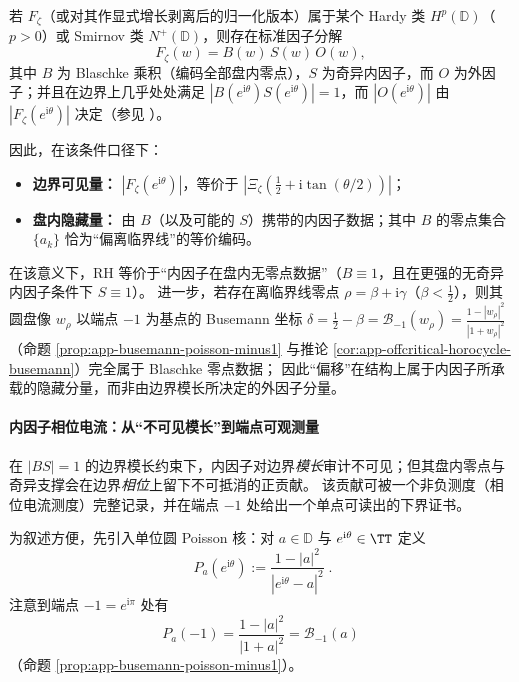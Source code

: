 \begin{remark}
若 \(F_{\zeta}\)（或对其作显式增长剥离后的归一化版本）属于某个 Hardy 类 \(H^p(\mathbb{D})\)（\(p>0\)）或 Smirnov 类 \(N^+(\mathbb{D})\)，则存在标准因子分解
\[
F_{\zeta}(w)=B(w)\,S(w)\,O(w),
\]
其中 \(B\) 为 Blaschke 乘积（编码全部盘内零点），\(S\) 为奇异内因子，而 \(O\) 为外因子；并且在边界上几乎处处满足 \(|B(e^{\mathrm{i}\theta})S(e^{\mathrm{i}\theta})|=1\)，而 \(|O(e^{\mathrm{i}\theta})|\) 由 \(|F_{\zeta}(e^{\mathrm{i}\theta})|\) 决定（参见 \cite{Duren1970TheoryHp,Garnett2007BoundedAnalyticFunctions}）。
\par
因此，在该条件口径下：
\begin{itemize}
  \item \textbf{边界可见量：} \(|F_{\zeta}(e^{\mathrm{i}\theta})|\)，等价于 \(|\Xi_{\zeta}(\tfrac12+\mathrm{i}\tan(\theta/2))|\)；
  \item \textbf{盘内隐藏量：} 由 \(B\)（以及可能的 \(S\)）携带的内因子数据；其中 \(B\) 的零点集合 \(\{a_k\}\) 恰为“偏离临界线”的等价编码。
\end{itemize}
在该意义下，RH 等价于“内因子在盘内无零点数据”（\(B\equiv 1\)，且在更强的无奇异内因子条件下 \(S\equiv 1\)）。
进一步，若存在离临界线零点 \(\rho=\beta+\mathrm{i}\gamma\)（\(\beta<\tfrac12\)），则其圆盘像 \(w_{\rho}\) 以端点 \(-1\) 为基点的 Busemann 坐标
\(
\delta=\tfrac12-\beta
=\mathcal{B}_{-1}(w_{\rho})=\frac{1-|w_{\rho}|^{2}}{|1+w_{\rho}|^{2}}
\)
（命题 \ref{prop:app-busemann-poisson-minus1} 与推论 \ref{cor:app-offcritical-horocycle-busemann}）完全属于 Blaschke 零点数据；
因此“偏移”在结构上属于内因子所承载的隐藏分量，而非由边界模长所决定的外因子分量。
\end{remark}

\paragraph{内因子相位电流：从“不可见模长”到端点可观测量}
在 \(|BS|=1\) 的边界模长约束下，内因子对边界\emph{模长}审计不可见；但其盘内零点与奇异支撑会在边界\emph{相位}上留下不可抵消的正贡献。
该贡献可被一个非负测度（相位电流测度）完整记录，并在端点 \(-1\) 处给出一个单点可读出的下界证书。

\medskip
为叙述方便，先引入单位圆 Poisson 核：对 \(a\in\mathbb{D}\) 与 \(e^{\mathrm{i}\theta}\in\TT\) 定义
\begin{equation}\label{eq:app-poisson-kernel}
\boxed{\;
P_a(e^{\mathrm{i}\theta})
:=\frac{1-|a|^2}{|e^{\mathrm{i}\theta}-a|^2}\; }.
\end{equation}
注意到端点 \(-1=e^{\mathrm{i}\pi}\) 处有
\begin{equation}\label{eq:app-poisson-kernel-endpoint-minus1}
\boxed{\;
P_a(-1)=\frac{1-|a|^2}{|1+a|^2}=\mathcal{B}_{-1}(a)\;}
\end{equation}
（命题 \ref{prop:app-busemann-poisson-minus1}）。

